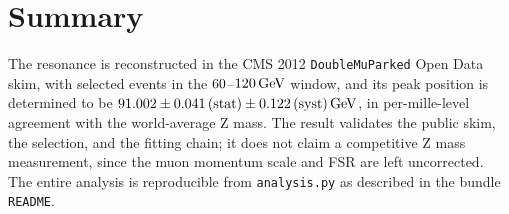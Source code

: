 \documentclass[11pt]{article}
\begin{document}
\section{Summary}

The \Zmm resonance is reconstructed in the CMS 2012 \texttt{DoubleMuParked}
Open Data skim, with \NEventsMassWindow{} selected events in the
$60$--$120\,\text{Ge\hspace{-.08em}V}$ window, and its peak position is determined
to be $91.002 \pm 0.041\,\text{(stat)} \pm 0.122\,\text{(syst)}\,\text{Ge\hspace{-.08em}V}$, in
per-mille-level agreement with the world-average Z mass. The result validates
the public skim, the selection, and the fitting chain; it does not claim a
competitive Z mass measurement, since the muon momentum scale and FSR are left
uncorrected. The entire analysis is reproducible from \texttt{analysis.py} as
described in the bundle \texttt{README}.



\end{document}
